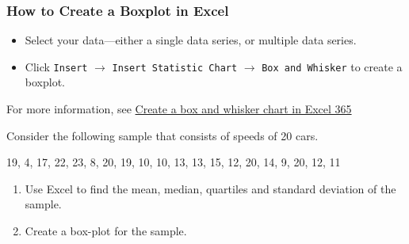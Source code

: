 \hypertarget{how-to-create-a-boxplot-in-excel}{%
\subsubsection{How to Create a Boxplot in
Excel}\label{how-to-create-a-boxplot-in-excel}}

\begin{itemize}
\item
  Select your data---either a single data series, or multiple data
  series.
\item
  Click \texttt{Insert} $\rightarrow$ \texttt{Insert\ Statistic\ Chart}
  $\rightarrow$ \texttt{Box\ and\ Whisker} to create a boxplot.
\end{itemize}

For more information, see
\href{https://support.microsoft.com/en-us/office/create-a-box-and-whisker-chart-62f4219f-db4b-4754-aca8-4743f6190f0d}{Create
a box and whisker chart in Excel 365}

\begin{exercise}

Consider the following sample that consists of speeds of 20 cars.

19, 4, 17, 22, 23, 8, 20, 19, 10, 10, 13, 13, 15, 12, 20, 14, 9, 20, 12,
11

\begin{enumerate}[sepno]
\item
  Use Excel to find the mean, median, quartiles and standard deviation
  of the sample.
\item
  Create a box-plot for the sample.
\end{enumerate}

\end{exercise}


